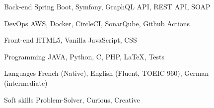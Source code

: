 

\begin{cvskills}

\cvskill
  {Back-end} %
  {Spring Boot, Symfony, GraphQL API, REST API, SOAP} %

  \cvskill
    {DevOps} %
    {AWS, Docker, CircleCI, SonarQube, Github Actions} %

  \cvskill
    {Front-end} %
    {HTML5, Vanilla JavaScript, CSS} %

  \cvskill
    {Programming} %
    {JAVA, Python, C, PHP, LaTeX, Tests} %

  \cvskill
    {Languages} %
    {French (Native), English (Fluent, TOEIC 960), German (intermediate)} %

  \cvskill
    {Soft skills} %
    {Problem-Solver, Curious, Creative} %

\end{cvskills}
